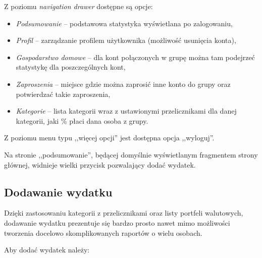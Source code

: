 \documentclass[12pt,a4paper,twoside,titlepage,openright]{book}
\begin{document}
\begin{enumerate}
Z poziomu \textit{navigation drawer} dostępne są opcje:
	\begin{itemize}
	\item \textit{Podsumowanie} -- podstawowa statystyka wyświetlana po zalogowaniu,
	\item \textit{Profil} -- zarządzanie profilem użytkownika (możliwość usunięcia konta),
	\item \textit{Gospodarstwo domowe} -- dla kont połączonych w grupę można tam podejrzeć statystykę dla poszczególnych kont,
	\item \textit{Zaproszenia} -- miejsce gdzie można zaprosić inne konto do grupy oraz potwierdzać takie zaproszenia,
	\item \textit{Kategorie} -- lista kategorii wraz z ustawionymi przelicznikami dla danej kategorii, jaki \% płaci dana osoba z grupy.
	\end{itemize}
	
Z poziomu menu typu ,,więcej opcji'' jest dostępna opcja ,,wyloguj''.

Na stronie ,,podsumowanie'', będącej domyślnie wyświetlanym fragmentem strony głównej, widnieje wielki przycisk pozwalający dodać wydatek.
\end{enumerate}

\subsection{Dodawanie wydatku}

Dzięki zastosowaniu kategorii z przelicznikami oraz listy portfeli walutowych, dodawanie wydatku prezentuje się bardzo prosto nawet mimo możliwości tworzenia docelowo skomplikowanych raportów o wielu osobach.

Aby dodać wydatek należy:
\end{document}
